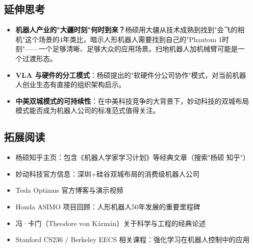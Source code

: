 \documentclass[a4paper]{article}
\begin{document}
\subsection{延伸思考}

\begin{itemize}
    \item \textbf{机器人产业的"大疆时刻"何时到来？}杨硕用大疆从技术成熟到找到"会飞的相机"这个场景的4年类比，暗示人形机器人需要找到自己的"Phantom 1时刻"——一个足够清晰、足够大众的应用场景。扫地机器人加机械臂可能是一个过渡形态。
    \item \textbf{VLA 与硬件的分工模式}：杨硕提出的"软硬件分公司协作"模式，对当前机器人创业生态有直接的组织架构启示。
    \item \textbf{中美双城模式的可持续性}：在中美科技竞争的大背景下，妙动科技的双城布局模式能否成为机器人公司的标准范式值得关注。
\end{itemize}

\subsection{拓展阅读}

\begin{itemize}
    \item 杨硕知乎主页：包含《机器人学家学习计划》等经典文章（搜索"杨硕 知乎"）
    \item 妙动科技官方信息：深圳+硅谷双城布局的消费级机器人公司
    \item Tesla Optimus 官方博客与演示视频
    \item Honda ASIMO 项目回顾：人形机器人50年发展的重要里程碑
    \item 冯·卡门（Theodore von K\'arm\'an）关于科学与工程的经典论述
    \item Stanford CS236 / Berkeley EECS 相关课程：强化学习在机器人控制中的应用
\end{itemize}

\end{document}
